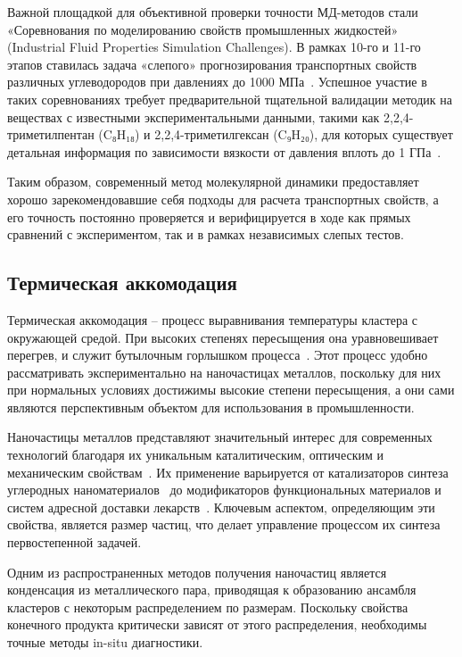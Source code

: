 Важной площадкой для объективной проверки точности МД-методов стали «Соревнования по моделированию свойств промышленных жидкостей» (Industrial Fluid Properties Simulation Challenges). В рамках 10-го и 11-го этапов ставилась задача «слепого» прогнозирования транспортных свойств различных углеводородов при давлениях до 1000 МПа~\cite{industrial_nodate}. Успешное участие в таких соревнованиях требует предварительной тщательной валидации методик на веществах с известными экспериментальными данными, такими как 2,2,4-триметилпентан (C₈H₁₈) и 2,2,4-триметилгексан (C₉H₂₀), для которых существует детальная информация по зависимости вязкости от давления вплоть до 1 ГПа~\cite{dymond_transport_1980, toraman_impact_2023}.

Таким образом, современный метод молекулярной динамики предоставляет хорошо зарекомендовавшие себя подходы для расчета транспортных свойств, а его точность постоянно проверяется и верифицируется в ходе как прямых сравнений с экспериментом, так и в рамках независимых слепых тестов.

\subsection{Термическая аккомодация}

Термическая аккомодация \--- процесс выравнивания температуры кластера с окружающей средой. При высоких степенях пересыщения она уравновешивает перегрев, и служит бутылочным горлышком процесса~\cite{eremin_influence_2008}. Этот процесс удобно рассматривать экспериментально на наночастицах металлов, поскольку для них при нормальных условиях достижимы высокие степени пересыщения, а они сами являются перспективным объектом для использования в промышленности.

Наночастицы металлов представляют значительный интерес для современных технологий благодаря их уникальным каталитическим, оптическим и механическим свойствам~\cite{gurentsov_analysis_2013, vorontsov_multiscale_2013, golovin_nanosuspension_2013}. Их применение варьируется от катализаторов синтеза углеродных наноматериалов~\cite{gurentsov_analysis_2013} до модификаторов функциональных материалов и систем адресной доставки лекарств~\cite{vorontsov_multiscale_2013, golovin_nanosuspension_2013}. Ключевым аспектом, определяющим эти свойства, является размер частиц, что делает управление процессом их синтеза первостепенной задачей.

Одним из распространенных методов получения наночастиц является конденсация из металлического пара, приводящая к образованию ансамбля кластеров с некоторым распределением по размерам. Поскольку свойства конечного продукта критически зависят от этого распределения, необходимы точные методы in-situ диагностики.

